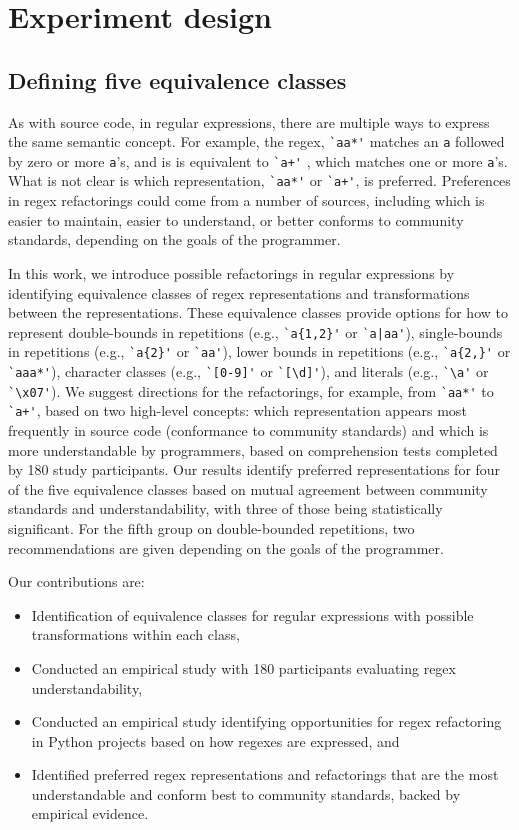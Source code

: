 \section{Experiment design}
\subsection{Defining five equivalence classes}
As with source code, in regular expressions, there are multiple ways to express the same semantic concept.
For example, the regex, \verb!`aa*'! matches an \verb!a! followed by zero or more \verb!a!'s, and is is equivalent to \verb!`a+'! , which matches one or more \verb!a!'s.
What is not clear is which representation,  \verb!`aa*'!  or  \verb!`a+'!, is preferred.
Preferences in regex refactorings could come from a number of sources, including which is easier to maintain, easier to understand, or better conforms to community standards, depending on the goals of the programmer.

In this work, we introduce possible refactorings in regular expressions by identifying equivalence classes of regex representations and transformations between the representations.
These equivalence classes provide options for how to represent double-bounds in repetitions (e.g., \verb!`a{1,2}'! or \verb!`a|aa'!), single-bounds in repetitions (e.g., \verb!`a{2}'! or \verb!`aa'!), lower bounds in repetitions (e.g., \verb!`a{2,}'! or \verb!`aaa*'!), character classes (e.g., \verb!`[0-9]'! or \verb!`[\d]'!), and literals (e.g., \verb!`\a'! or \verb!`\x07'!).
We suggest directions for the refactorings, for example, from \verb!`aa*'!  to  \verb!`a+'!, based on two high-level concepts: which representation appears most frequently in source code (conformance to community standards) and which is more understandable by programmers, based on comprehension tests completed by 180 study participants.
Our results identify preferred representations for four of the five equivalence classes based on mutual agreement between community standards and understandability, with three of those being statistically significant. For the fifth group on double-bounded repetitions, two recommendations are given depending on the goals of the programmer.

Our contributions are:
\begin{itemize}
\item Identification of  equivalence classes for regular expressions with possible transformations within each class,
\item Conducted an empirical study with 180 participants evaluating regex understandability,
\item Conducted an empirical study identifying opportunities for regex refactoring  in Python projects based on how regexes are expressed, and
\item {Identified preferred regex representations and refactorings that are the most understandable and conform best to community standards, backed by empirical evidence.}
\end{itemize}

